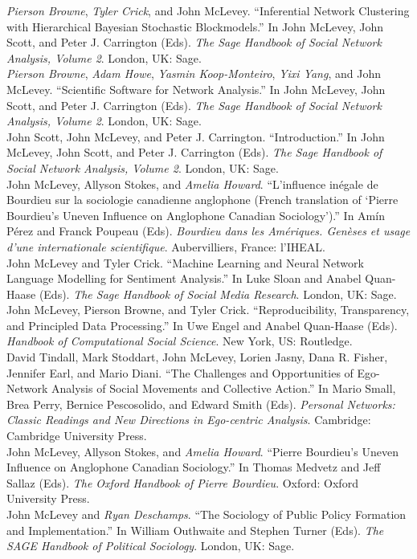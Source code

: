 \documentclass[11pt, a4paper]{article}
\newcommand{\note}[1]{\marginnote{\scriptsize #1}}
\begin{document}
\noindent
  \note{2023}\emph{Pierson Browne}, \emph{Tyler Crick}, and John
McLevey. ``Inferential Network Clustering with Hierarchical Bayesian
Stochastic Blockmodels.'' In John McLevey, John Scott, and Peter J.
Carrington (Eds). \emph{The Sage Handbook of Social Network Analysis,
Volume 2}. London, UK: Sage. \\[.2cm]
  \note{2023}\emph{Pierson Browne}, \emph{Adam Howe}, \emph{Yasmin
Koop-Monteiro}, \emph{Yixi Yang}, and John McLevey. ``Scientific
Software for Network Analysis.'' In John McLevey, John Scott, and Peter
J. Carrington (Eds). \emph{The Sage Handbook of Social Network Analysis,
Volume 2}. London, UK: Sage. \\[.2cm]
  \note{2023}John Scott, John McLevey, and Peter J.
Carrington. ``Introduction.'' In John McLevey, John Scott, and Peter J.
Carrington (Eds). \emph{The Sage Handbook of Social Network Analysis,
Volume 2}. London, UK: Sage. \\[.2cm]
  \note{2023}John McLevey, Allyson Stokes, and \emph{Amelia
Howard}. ``L'influence inégale de Bourdieu sur la sociologie canadienne
anglophone (French translation of `Pierre Bourdieu's Uneven Influence on
Anglophone Canadian Sociology').'' In Amín Pérez and Franck
Poupeau (Eds). \emph{Bourdieu dans les Amériques. Genèses et usage d'une
internationale scientifique}. Aubervilliers, France: l'IHEAL. \\[.2cm]
  \note{2021}John McLevey and Tyler Crick. ``Machine Learning and Neural
Network Language Modelling for Sentiment Analysis.'' In Luke Sloan and
Anabel Quan-Haase (Eds). \emph{The Sage Handbook of Social Media
Research}. London, UK: Sage. \\[.2cm]
  \note{2021}John McLevey, Pierson Browne, and Tyler
Crick. ``Reproducibility, Transparency, and Principled Data
Processing.'' In Uwe Engel and Anabel Quan-Haase (Eds). \emph{Handbook
of Computational Social Science}. New York, US: Routledge. \\[.2cm]
  \note{2021}David Tindall, Mark Stoddart, John McLevey, Lorien Jasny,
Dana R. Fisher, Jennifer Earl, and Mario Diani. ``The Challenges and
Opportunities of Ego-Network Analysis of Social Movements and Collective
Action.'' In Mario Small, Brea Perry, Bernice Pescosolido, and Edward
Smith (Eds). \emph{Personal Networks: Classic Readings and New
Directions in Ego-centric Analysis}. Cambridge: Cambridge University
Press. \\[.2cm]
  \note{2018}John McLevey, Allyson Stokes, and \emph{Amelia
Howard}. ``Pierre Bourdieu's Uneven Influence on Anglophone Canadian
Sociology.'' In Thomas Medvetz and Jeff Sallaz (Eds). \emph{The Oxford
Handbook of Pierre Bourdieu}. Oxford: Oxford University Press. \\[.2cm]
  \note{2018}John McLevey and \emph{Ryan Deschamps}. ``The Sociology of
Public Policy Formation and Implementation.'' In William Outhwaite and
Stephen Turner (Eds). \emph{The SAGE Handbook of Political
Sociology}. London, UK: Sage. \\[.2cm]
\end{document}
